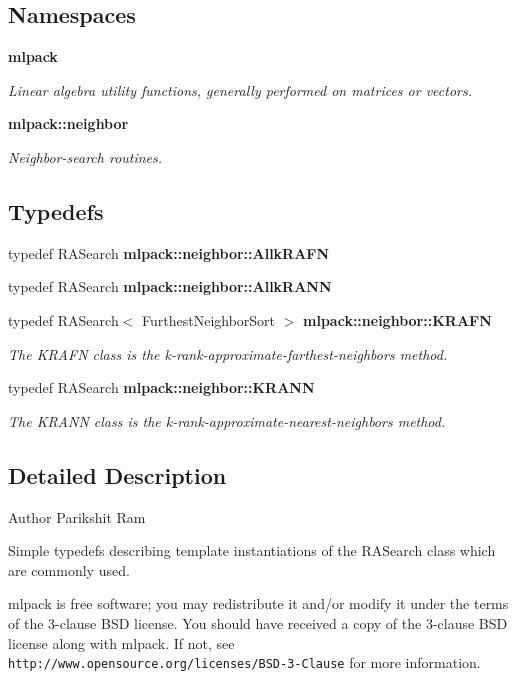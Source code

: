 \subsection*{Namespaces}
\begin{DoxyCompactItemize}
\item 
 {\bf mlpack}
\begin{DoxyCompactList}\small\item\em Linear algebra utility functions, generally performed on matrices or vectors. \end{DoxyCompactList}\item 
 {\bf mlpack\+::neighbor}
\begin{DoxyCompactList}\small\item\em Neighbor-\/search routines. \end{DoxyCompactList}\end{DoxyCompactItemize}
\subsection*{Typedefs}
\begin{DoxyCompactItemize}
\item 
typedef R\+A\+Search {\bf mlpack\+::neighbor\+::\+Allk\+R\+A\+FN}
\item 
typedef R\+A\+Search {\bf mlpack\+::neighbor\+::\+Allk\+R\+A\+NN}
\item 
typedef R\+A\+Search$<$ Furthest\+Neighbor\+Sort $>$ {\bf mlpack\+::neighbor\+::\+K\+R\+A\+FN}
\begin{DoxyCompactList}\small\item\em The K\+R\+A\+FN class is the k-\/rank-\/approximate-\/farthest-\/neighbors method. \end{DoxyCompactList}\item 
typedef R\+A\+Search {\bf mlpack\+::neighbor\+::\+K\+R\+A\+NN}
\begin{DoxyCompactList}\small\item\em The K\+R\+A\+NN class is the k-\/rank-\/approximate-\/nearest-\/neighbors method. \end{DoxyCompactList}\end{DoxyCompactItemize}


\subsection{Detailed Description}
\begin{DoxyAuthor}{Author}
Parikshit Ram
\end{DoxyAuthor}
Simple typedefs describing template instantiations of the R\+A\+Search class which are commonly used.

mlpack is free software; you may redistribute it and/or modify it under the terms of the 3-\/clause B\+SD license. You should have received a copy of the 3-\/clause B\+SD license along with mlpack. If not, see {\tt http\+://www.\+opensource.\+org/licenses/\+B\+S\+D-\/3-\/\+Clause} for more information. 
